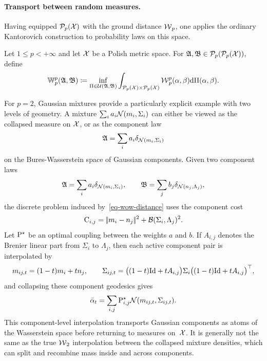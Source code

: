 \paragraph{Transport between random measures.}
Having equipped $\Pp_p(\X)$ with the ground distance $\Wass_p$, one applies the ordinary Kantorovich construction to probability laws on this space.
\begin{defn}\label{def-wasserstein-over-wasserstein}
Let $1\leq p<+\infty$ and let $\X$ be a Polish metric space. For $\mathfrak A,\mathfrak B\in\Pp_p(\Pp_p(\X))$, define
\begin{equation}\label{eq-wow-distance}
	\mathbb W_p^p(\mathfrak A,\mathfrak B)
	\eqdef
	\inf_{\Pi\in\Couplings(\mathfrak A,\mathfrak B)}
	\int_{\Pp_p(\X)\times\Pp_p(\X)}
	\Wass_p^p(\alpha,\beta)\d\Pi(\alpha,\beta).
\end{equation}
\end{defn}
For $p=2$, Gaussian mixtures provide a particularly explicit example with two levels of geometry. A mixture
$\sum_i a_i\Gaussian(m_i,\Sigma_i)$ can either be viewed as the collapsed measure on $\X$, or as the component law
\[
	\mathfrak A=\sum_i a_i\delta_{\Gaussian(m_i,\Sigma_i)}
\]
on the Bures-Wasserstein space of Gaussian components. Given two component laws
\[
	\mathfrak A=\sum_i a_i\delta_{\Gaussian(m_i,\Sigma_i)},
	\qquad
	\mathfrak B=\sum_j b_j\delta_{\Gaussian(n_j,\Lambda_j)},
\]
the discrete problem induced by~\eqref{eq-wow-distance} uses the component cost
\[
	\C_{i,j}=\norm{m_i-n_j}^2+\Bb(\Sigma_i,\Lambda_j)^2.
\]
Let $\P^\star$ be an optimal coupling between the weights $a$ and $b$. If $A_{i,j}$ denotes the Brenier linear part from $\Sigma_i$ to $\Lambda_j$, then each active component pair is interpolated by
\[
	m_{ij,t}=(1-t)m_i+t n_j,
	\qquad
	\Sigma_{ij,t}
	=
	\big((1-t)\Id+tA_{i,j}\big)\Sigma_i
	\big((1-t)\Id+tA_{i,j}\big)^\top,
\]
and collapsing these component geodesics gives
\[
	\bar\alpha_t=
	\sum_{i,j}\P^\star_{i,j}\Gaussian(m_{ij,t},\Sigma_{ij,t}).
\]
This component-level interpolation transports Gaussian components as atoms of the Wasserstein space before returning to measures on~$\X$. It is generally not the same as the true $\Wass_2$ interpolation between the collapsed mixture densities, which can split and recombine mass inside and across components.

